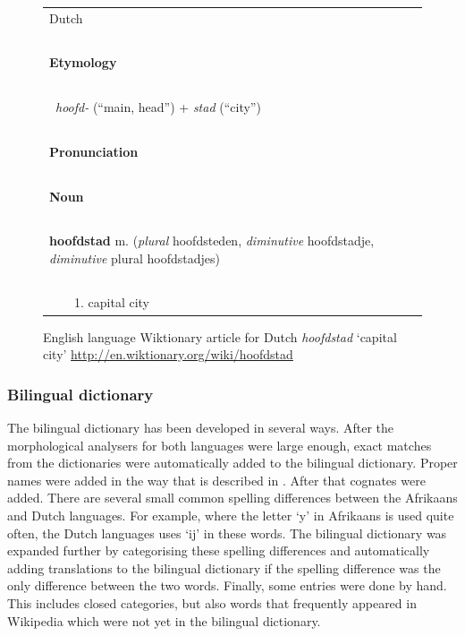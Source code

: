 \documentclass[11pt]{article}
\begin{document}
\begin{figure}
\centering
\begin{small}
\begin{tabular}{|l|}
\hline
{\large Dutch} \\
~\\
{\bf Etymology}\\
~\\
~{\em hoofd-} (``main, head'') + {\em stad} (``city'')\\
~\\
{\bf Pronunciation}\\
~\\
{\bf Noun}\\
~\\
{\bf hoofdstad} m. ({\em plural} hoofdsteden, {\em diminutive} hoofdstadje, {\em diminutive} plural hoofdstadjes) \\
~\\
~~~~1. capital city \\

\hline
\end{tabular}
\end{small}
\caption{English language Wiktionary article for Dutch \emph{hoofdstad} `capital city' 
    {\small \url{http://en.wiktionary.org/wiki/hoofdstad}}}
\label{fig:wikt1}
\end{figure}

\subsubsection{Bilingual dictionary}

The bilingual dictionary has been developed in several ways. After the morphological 
analysers for both languages were large enough, exact matches from the dictionaries
were automatically added to the bilingual dictionary. Proper names were added in the
way that is described in \cite{Tyers:08}. After that cognates were added. There are several
small common spelling differences between the Afrikaans and Dutch languages. For example,
where the letter `y' in Afrikaans is used quite often, the Dutch languages uses `ij' in these words.
The bilingual dictionary was expanded further by categorising these spelling differences and
automatically adding translations to the bilingual dictionary if the spelling difference was the
only difference between the two words. Finally, some entries were done by hand.
This includes closed categories, but also words that frequently appeared in Wikipedia
which were not yet in the bilingual dictionary.
\end{document}
